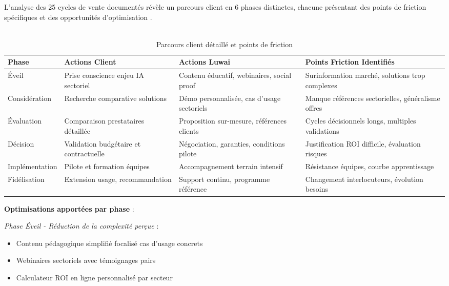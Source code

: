 L'analyse des 25 cycles de vente documentés révèle un parcours client en 6 phases distinctes, chacune présentant des points de friction spécifiques et des opportunités d'optimisation \cite{luwai2025journey}.
\\\\
\begin{table}[ht]
\centering
\caption{Parcours client détaillé et points de friction}
\label{tab:customer_journey}
\begin{tabular}{@{}p{2.5cm}p{4cm}p{4cm}p{4.5cm}@{}}
\toprule
\textbf{Phase} & \textbf{Actions Client} & \textbf{Actions Luwai} & \textbf{Points Friction Identifiés} \\
\midrule
Éveil & Prise conscience enjeu IA sectoriel & Contenu éducatif, webinaires, social proof & Surinformation marché, solutions trop complexes \\
Considération & Recherche comparative solutions & Démo personnalisée, cas d'usage sectoriels & Manque références sectorielles, généralisme offres \\
Évaluation & Comparaison prestataires détaillée & Proposition sur-mesure, références clients & Cycles décisionnels longs, multiples validations \\
Décision & Validation budgétaire et contractuelle & Négociation, garanties, conditions pilote & Justification ROI difficile, évaluation risques \\
Implémentation & Pilote et formation équipes & Accompagnement terrain intensif & Résistance équipes, courbe apprentissage \\
Fidélisation & Extension usage, recommandation & Support continu, programme référence & Changement interlocuteurs, évolution besoins \\
\bottomrule
\end{tabular}
\end{table}

\textbf{Optimisations apportées par phase} :

\emph{Phase Éveil - Réduction de la complexité perçue} :
\begin{itemize}
    \item Contenu pédagogique simplifié focalisé cas d'usage concrets
    \item Webinaires sectoriels avec témoignages pairs
    \item Calculateur ROI en ligne personnalisé par secteur
\end{itemize}

